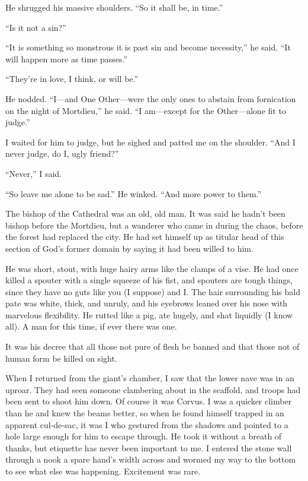 He shrugged his massive shoulders. “So it shall be, in time.”

“Is it not a sin?”

“It is something so monstrous it is past sin and become necessity,” he said. “It will happen more as time passes.”

“They’re in love, I think, or will be.”

He nodded. “I—and One Other—were the only ones to abstain from fornication on the night of Mortdieu,” he said. “I am—except for the Other—alone fit to judge.”

I waited for him to judge, but he sighed and patted me on the shoulder. “And I never judge, do I, ugly friend?”

“Never,” I said.

“So leave me alone to be sad.” He winked. “And more power to them.”

The bishop of the Cathedral was an old, old man. It was said he hadn’t been bishop before the Mortdieu, but a wanderer who came in during the chaos, before the forest had replaced the city. He had set himself up as titular head of this section of God’s former domain by saying it had been willed to him.

He was short, stout, with huge hairy arms like the clamps of a vise. He had once killed a spouter with a single squeeze of his fist, and spouters are tough things, since they have no guts like you (I suppose) and I. The hair surrounding his bald pate was white, thick, and unruly, and his eyebrows leaned over his nose with marvelous flexibility. He rutted like a pig, ate hugely, and shat liquidly (I know all). A man for this time, if ever there was one.

It was his decree that all those not pure of flesh be banned and that those not of human form be killed on sight.

When I returned from the giant’s chamber, I saw that the lower nave was in an uproar. They had seen someone clambering about in the scaffold, and troops had been sent to shoot him down. Of course it was Corvus. I was a quicker climber than he and knew the beams better, so when he found himself trapped in an apparent cul-de-sac, it was I who gestured from the shadows and pointed to a hole large enough for him to escape through. He took it without a breath of thanks, but etiquette has never been important to me. I entered the stone wall through a nook a spare hand’s width across and wormed my way to the bottom to see what else was happening. Excitement was rare.


